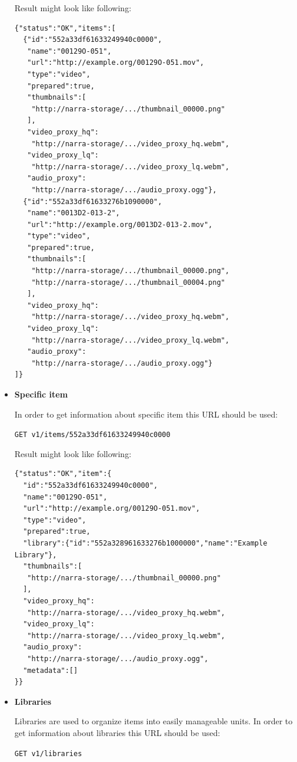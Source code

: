 \documentclass[thesis=B,english]{FITthesis}[2012/10/20]
\begin{document}
\begin{itemize}
Result might look like following:
\label{toc:api_items}
\begin{verbatim}
{"status":"OK","items":[
  {"id":"552a33df61633249940c0000",
   "name":"00129O-051",
   "url":"http://example.org/00129O-051.mov",
   "type":"video",
   "prepared":true,
   "thumbnails":[
    "http://narra-storage/.../thumbnail_00000.png"
   ],
   "video_proxy_hq":
    "http://narra-storage/.../video_proxy_hq.webm",
   "video_proxy_lq":
    "http://narra-storage/.../video_proxy_lq.webm",
   "audio_proxy":
    "http://narra-storage/.../audio_proxy.ogg"},
  {"id":"552a33df61633276b1090000",
   "name":"0013D2-013-2",
   "url":"http://example.org/0013D2-013-2.mov",
   "type":"video",
   "prepared":true,
   "thumbnails":[
    "http://narra-storage/.../thumbnail_00000.png",
    "http://narra-storage/.../thumbnail_00004.png"
   ],
   "video_proxy_hq":
    "http://narra-storage/.../video_proxy_hq.webm",
   "video_proxy_lq":
    "http://narra-storage/.../video_proxy_lq.webm",
   "audio_proxy":
    "http://narra-storage/.../audio_proxy.ogg"}
]}
\end{verbatim}

		\item \textbf{Specific item}

In order to get information about specific item this URL should be used:

\texttt{GET v1/items/552a33df61633249940c0000}

Result might look like following:
\begin{verbatim}
{"status":"OK","item":{
  "id":"552a33df61633249940c0000",
  "name":"00129O-051",
  "url":"http://example.org/00129O-051.mov",
  "type":"video",
  "prepared":true,
  "library":{"id":"552a328961633276b1000000","name":"Example Library"},
  "thumbnails":[
   "http://narra-storage/.../thumbnail_00000.png"
  ],
  "video_proxy_hq":
   "http://narra-storage/.../video_proxy_hq.webm",
  "video_proxy_lq":
   "http://narra-storage/.../video_proxy_lq.webm",
  "audio_proxy":
   "http://narra-storage/.../audio_proxy.ogg",
  "metadata":[]
}}
\end{verbatim}

		\item \textbf{Libraries}

Libraries are used to organize items into easily manageable units. In order to get information about libraries this URL should be used:

\texttt{GET v1/libraries}


\end{itemize}
\end{document}

